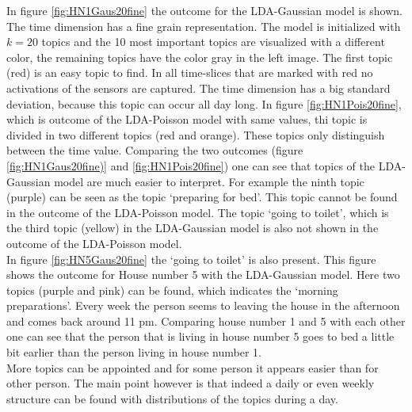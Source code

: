 In figure \ref{fig:HN1Gaus20fine} the outcome for the LDA-Gaussian model is shown. The time dimension has a fine grain representation. The model is initialized with $k=20$ topics and the 10 most important topics are visualized with a different color, the remaining topics have the color gray in the left image. The first topic (red) is an easy topic to find. In all time-slices that are marked with red no activations of the sensors are captured. The time dimension has a big standard deviation, because this topic can occur all day long. In figure \ref{fig:HN1Pois20fine}, which is outcome of the LDA-Poisson model with same values, thi topic is divided in two different topics (red and orange). These topics only distinguish between the time value. Comparing the two outcomes (figure \ref{fig:HN1Gaus20fine)} and \ref{fig:HN1Pois20fine}) one can see that topics of the LDA-Gaussian model are much easier to interpret. For example the ninth topic (purple) can be seen as the topic `preparing for bed'. This topic cannot be found in the outcome of the LDA-Poisson model. The topic `going to toilet', which is the third topic (yellow) in the LDA-Gaussian model is also not shown in the outcome of the LDA-Poisson model.\\

In figure \ref{fig:HN5Gaus20fine} the `going to toilet' is also present. This figure shows the outcome for House number 5 with the LDA-Gaussian model. Here two topics (purple and pink) can be found, which indicates the `morning preparations'. Every week the person seems to leaving the house in the afternoon and comes back around 11 pm. Comparing house number 1 and 5 with each other one can see that the person that is living in house number 5 goes to bed a little bit earlier than the person living in house number 1.\\

More topics can be appointed and for some person it appears easier than for other person. The main point however is that indeed a daily or even weekly structure can be found with distributions of the topics during a day. 

